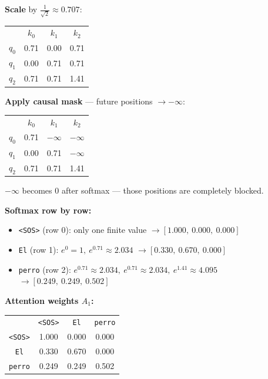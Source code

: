\noindent\textbf{Scale} by $\frac{1}{\sqrt{2}} \approx 0.707$:

\begin{center}
\begin{tabular}{c|ccc}
 & $k_0$ & $k_1$ & $k_2$ \\
$q_0$ & 0.71 & 0.00 & 0.71 \\
$q_1$ & 0.00 & 0.71 & 0.71 \\
$q_2$ & 0.71 & 0.71 & 1.41 \\
\end{tabular}
\end{center}

\noindent\textbf{Apply causal mask} --- future positions $\to -\infty$:

\begin{center}
\begin{tabular}{c|ccc}
 & $k_0$ & $k_1$ & $k_2$ \\
$q_0$ & 0.71 & $-\infty$ & $-\infty$ \\
$q_1$ & 0.00 & 0.71 & $-\infty$ \\
$q_2$ & 0.71 & 0.71 & 1.41 \\
\end{tabular}
\end{center}

$-\infty$ becomes 0 after softmax --- those positions are completely blocked.

\noindent\textbf{Softmax row by row:}

\begin{itemize}
\item \texttt{<SOS>} (row 0): only one finite value $\to [1.000,\ 0.000,\ 0.000]$
\item \texttt{El} (row 1): $e^0=1,\ e^{0.71}\approx 2.034$ $\to [0.330,\ 0.670,\ 0.000]$
\item \texttt{perro} (row 2): $e^{0.71}\approx 2.034,\ e^{0.71}\approx 2.034,\ e^{1.41}\approx 4.095$ $\to [0.249,\ 0.249,\ 0.502]$
\end{itemize}

\noindent\textbf{Attention weights $A_1$:}

\begin{center}
\begin{tabular}{c|ccc}
 & \texttt{<SOS>} & \texttt{El} & \texttt{perro} \\
\texttt{<SOS>} & 1.000 & 0.000 & 0.000 \\
\texttt{El} & 0.330 & 0.670 & 0.000 \\
\texttt{perro} & 0.249 & 0.249 & 0.502 \\
\end{tabular}
\end{center}

